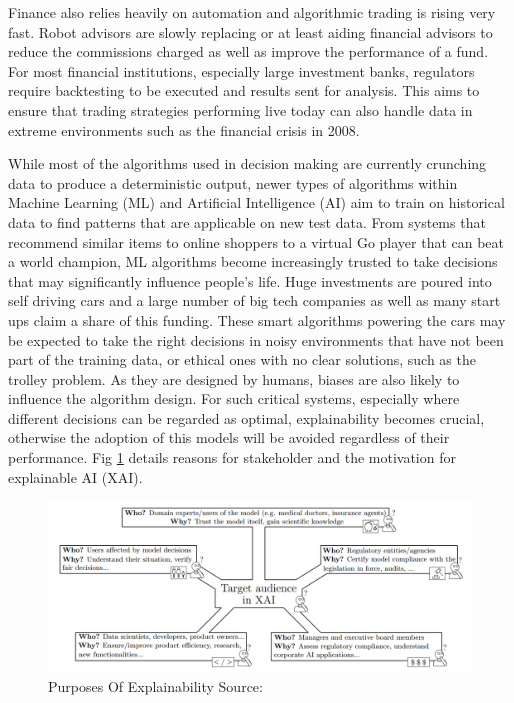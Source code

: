 \documentclass[proposal]{softeng}
\begin{document}
Finance also relies heavily on automation and algorithmic trading is rising very fast. Robot advisors are slowly replacing or at least aiding financial advisors to reduce the commissions charged as well as improve the performance of a fund\cite{robot}. For most financial institutions, especially large investment banks, regulators require backtesting to be executed and results sent for analysis\cite{backtesting}. This aims to ensure that trading strategies performing live today can also handle data in extreme environments such as the financial crisis in 2008.

While most of the algorithms used in decision making are currently crunching data to produce a deterministic output, newer types of algorithms within Machine Learning (ML) and Artificial Intelligence (AI) aim to train on historical data to find patterns that are applicable on new test data. From systems that recommend similar items to online shoppers to a virtual Go player that can beat a world champion\cite{alphago}, ML algorithms become increasingly trusted to take decisions that may significantly influence people's life. Huge investments are poured into self driving cars and a large number of big tech companies as well as many start ups\cite{autonomous} claim a share of this funding. These smart algorithms powering the cars may be expected to take the right decisions in noisy environments that have not been part of the training data, or ethical ones with no clear solutions, such as the trolley problem\cite{trolley}. As they are designed by humans, biases are also likely to influence the algorithm design. For such critical systems, especially where different decisions can be regarded as optimal, explainability becomes crucial, otherwise the adoption of this models will be avoided regardless of their performance. Fig \ref{fig:purposes_of_explainability} details reasons for stakeholder and the motivation for explainable AI (XAI).

\begin{figure}[h!]
\centering
  \includegraphics[width=.9\textwidth]{images/purposes_of_explainability.png}
  \caption{Purposes Of Explainability Source:\cite{BarredoArrietaAlejandro2020EAIX}}
  \label{fig:purposes_of_explainability}
\end{figure}
\end{document}
